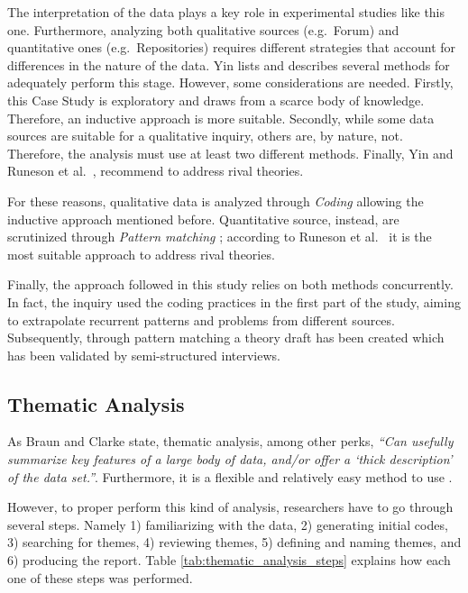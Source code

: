 The interpretation of the data plays a key role in experimental studies like this one. Furthermore, analyzing both qualitative sources (e.g.\ Forum) and quantitative ones (e.g.\ Repositories) requires different strategies that account for differences in the nature of the data. Yin \cite{case_study_guide} lists and describes several methods for adequately perform this stage. However, some considerations are needed. Firstly, this Case Study is exploratory and draws from a scarce body of knowledge. Therefore, an inductive approach is more suitable. Secondly, while some data sources are suitable for a qualitative inquiry, others are, by nature, not. Therefore, the analysis must use at least two different methods. Finally, Yin \cite{case_study_guide} and Runeson et al.\ \cite{case_study_software_engineering}, recommend to address rival theories.

For these reasons, qualitative data is analyzed through \textit{Coding} \cite{qualitative_inquiry} allowing the inductive approach mentioned before. Quantitative source, instead, are scrutinized through \textit{Pattern matching} \cite{case_study_guide}; according to Runeson et al.\ \cite{case_study_software_engineering} it is the most suitable approach to address rival theories.

Finally, the approach followed in this study relies on both methods concurrently. In fact, the inquiry used the coding practices in the first part of the study, aiming to extrapolate recurrent patterns and problems from different sources. Subsequently, through pattern matching a theory draft has been created which has been validated by semi-structured interviews.

\subsection{Thematic Analysis}
As Braun and Clarke \cite{thematic_analysis} state, thematic analysis, among other perks, \textit{``Can usefully summarize key features of a large body of data, and/or offer a ‘thick description’ of the data set.''}. Furthermore, it is a flexible and relatively easy method to use \cite{thematic_analysis}.

However, to proper perform this kind of analysis, researchers have to go through several steps. Namely 1) familiarizing with the data, 2) generating initial codes, 3) searching for themes, 4) reviewing themes, 5) defining and naming themes, and 6) producing the report. Table \ref{tab:thematic_analysis_steps} explains how each one of these steps was performed.

